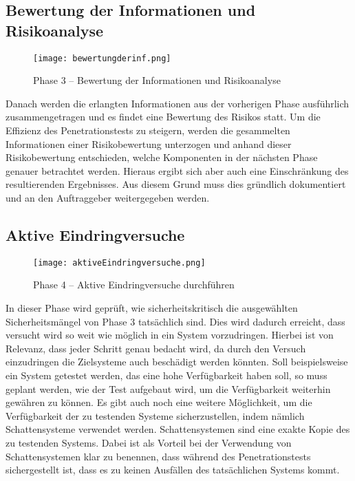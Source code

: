 \subsection{Bewertung der Informationen und Risikoanalyse}

\begin{figure}[h]
	\centering
	\texttt{[image: bewertungderinf.png]}
	\caption{Phase 3 – Bewertung der Informationen und Risikoanalyse}
\end{figure}

Danach werden die erlangten Informationen aus der vorherigen Phase ausführlich zusammengetragen und es findet eine Bewertung des Risikos statt. Um die Effizienz des Penetrationstests zu steigern, werden die gesammelten Informationen einer Risikobewertung unterzogen und anhand dieser Risikobewertung entschieden, welche Komponenten in der nächsten Phase genauer betrachtet werden. Hieraus ergibt sich aber auch eine Einschränkung des resultierenden Ergebnisses. Aus diesem Grund muss dies gründlich dokumentiert und an den Auftraggeber weitergegeben werden.

\subsection{Aktive Eindringversuche}

\begin{figure}[h]
	\centering
	\texttt{[image: aktiveEindringversuche.png]}
	\caption{Phase 4 – Aktive Eindringversuche durchführen}
\end{figure}

In dieser Phase wird geprüft, wie sicherheitskritisch die ausgewählten Sicherheitsmängel von Phase 3 tatsächlich sind. Dies wird dadurch erreicht, dass versucht wird so weit wie möglich in ein System vorzudringen. Hierbei ist von Relevanz, dass jeder Schritt genau bedacht wird, da durch den Versuch einzudringen die Zielsysteme auch beschädigt werden könnten. Soll beispielsweise ein System getestet werden, das eine hohe Verfügbarkeit haben soll, so muss geplant werden, wie der Test aufgebaut wird, um die Verfügbarkeit weiterhin gewähren zu können. Es gibt auch noch eine weitere Möglichkeit, um die Verfügbarkeit der zu testenden Systeme sicherzustellen, indem nämlich Schattensysteme verwendet werden. Schattensystemen sind eine exakte Kopie des zu testenden Systems. Dabei ist als Vorteil bei der Verwendung von Schattensystemen klar zu benennen, dass während des Penetrationstests sichergestellt ist, dass es zu keinen Ausfällen des tatsächlichen Systems kommt.

